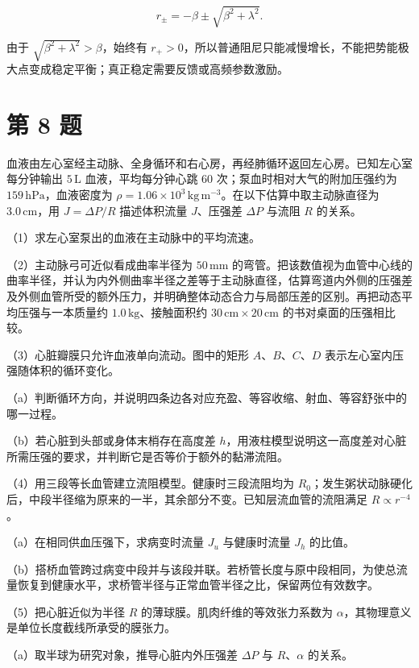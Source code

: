 \documentclass[12pt,a4paper,UTF8]{ctexart}
\begin{document}
\[
r_\pm=-\beta\pm\sqrt{\beta^2+\lambda^2}.
\]

由于 \(\sqrt{\beta^2+\lambda^2}>\beta\)，始终有
\(r_+>0\)，所以普通阻尼只能减慢增长，不能把势能极大点变成稳定平衡；真正稳定需要反馈或高频参数激励。

\newpage

\section{第 8 题}\label{ux7b2c-8-ux9898}

血液由左心室经主动脉、全身循环和右心房，再经肺循环返回左心房。已知左心室每分钟输出
\(5\,\mathrm L\) 血液，平均每分钟心跳 \(60\)
次；泵血时相对大气的附加压强约为 \(159\,\mathrm{hPa}\)，血液密度为
\(\rho=1.06\times10^3\,\mathrm{kg\,m^{-3}}\)。在以下估算中取主动脉直径为
\(3.0\,\mathrm{cm}\)，用 \(J=\Delta P/R\) 描述体积流量 \(J\)、压强差
\(\Delta P\) 与流阻 \(R\) 的关系。

（1）求左心室泵出的血液在主动脉中的平均流速。

（2）主动脉弓可近似看成曲率半径为 \(50\,\mathrm{mm}\)
的弯管。把该数值视为血管中心线的曲率半径，并认为内外侧曲率半径之差等于主动脉直径，估算弯道内外侧的压强差及外侧血管所受的额外压力，并明确整体动态合力与局部压差的区别。再把动态平均压强与一本质量约
\(1.0\,\mathrm{kg}\)、接触面积约
\(30\,\mathrm{cm}\times20\,\mathrm{cm}\) 的书对桌面的压强相比较。

（3）心脏瓣膜只允许血液单向流动。图中的矩形 \(A\)、\(B\)、\(C\)、\(D\)
表示左心室内压强随体积的循环变化。

（a）判断循环方向，并说明四条边各对应充盈、等容收缩、射血、等容舒张中的哪一过程。

（b）若心脏到头部或身体末梢存在高度差
\(h\)，用液柱模型说明这一高度差对心脏所需压强的要求，并判断它是否等价于额外的黏滞流阻。

（4）用三段等长血管建立流阻模型。健康时三段流阻均为
\(R_0\)；发生粥状动脉硬化后，中段半径缩为原来的一半，其余部分不变。已知层流血管的流阻满足
\(R\propto r^{-4}\)。

（a）在相同供血压强下，求病变时流量 \(J_u\) 与健康时流量 \(J_h\)
的比值。

（b）搭桥血管跨过病变中段并与该段并联。若桥管长度与原中段相同，为使总流量恢复到健康水平，求桥管半径与正常血管半径之比，保留两位有效数字。

（5）把心脏近似为半径 \(R\) 的薄球膜。肌肉纤维的等效张力系数为
\(\alpha\)，其物理意义是单位长度截线所承受的膜张力。

（a）取半球为研究对象，推导心脏内外压强差 \(\Delta P\) 与
\(R\)、\(\alpha\) 的关系。
\end{document}
